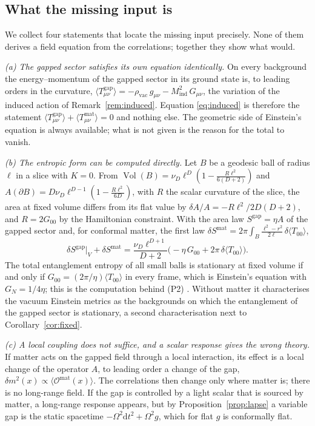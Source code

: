 \documentclass[11pt,a4paper]{article}
\theoremstyle{stmt}
\theoremstyle{defn}
\theoremstyle{rmk}
\numberwithin{equation}{section}
\DeclareMathOperator{\Vol}{Vol}
\newcommand{\dd}{\mathrm{d}}
\begin{document}
\subsection{What the missing input is}\label{sec:central}

We collect four statements that locate the missing input precisely. None of them derives a field equation from the correlations; together they show what would.

\emph{(a) The gapped sector satisfies its own equation identically.} On every background the energy--momentum of the gapped sector in its ground state is, to leading orders in the curvature, $\langle T^{\mathrm{gap}}_{\mu\nu}\rangle=-\rho_{\mathrm{vac}}\,g_{\mu\nu}-M_{\mathrm{ind}}^2\,G_{\mu\nu}$, the variation of the induced action of Remark~\ref{rem:induced}. Equation \eqref{eq:induced} is therefore the statement $\langle T^{\mathrm{gap}}_{\mu\nu}\rangle+\langle T^{\mathrm{mat}}_{\mu\nu}\rangle=0$ and nothing else. The geometric side of Einstein's equation is always available; what is not given is the reason for the total to vanish.

\emph{(b) The entropic form can be computed directly.} Let $B$ be a geodesic ball of radius $\ell$ in a slice with $K=0$. From $\Vol(B)=\nu_D\ell^D(1-\tfrac{R\ell^2}{6(D+2)})$ and $A(\partial B)=D\nu_D\ell^{D-1}(1-\tfrac{R\ell^2}{6D})$, with $R$ the scalar curvature of the slice, the area at fixed volume differs from its flat value by $\delta A/A=-R\ell^2/2D(D+2)$, and $R=2G_{00}$ by the Hamiltonian constraint. With the area law $S^{\mathrm{gap}}=\eta A$ of the gapped sector and, for conformal matter, the first law $\delta S^{\mathrm{mat}}=2\pi\int_B\frac{\ell^2-r^2}{2\ell}\,\delta\langle T_{00}\rangle$,
\begin{equation}\label{eq:equilibrium}
\delta S^{\mathrm{gap}}\big|_V+\delta S^{\mathrm{mat}}=\frac{\nu_D\ell^{D+1}}{D+2}\Big(-\eta\,G_{00}+2\pi\,\delta\langle T_{00}\rangle\Big).
\end{equation}
The total entanglement entropy of all small balls is stationary at fixed volume if and only if $G_{00}=(2\pi/\eta)\langle T_{00}\rangle$ in every frame, which is Einstein's equation with $G_N=1/4\eta$; this is the computation behind (P2) \cite{Jacobson16}. Without matter it characterises the vacuum Einstein metrics as the backgrounds on which the entanglement of the gapped sector is stationary, a second characterisation next to Corollary~\ref{cor:fixed}.

\emph{(c) A local coupling does not suffice, and a scalar response gives the wrong theory.} If matter acts on the gapped field through a local interaction, its effect is a local change of the operator $A$, to leading order a change of the gap, $\delta m^2(x)\propto\langle\mathcal O^{\mathrm{mat}}(x)\rangle$. The correlations then change only where matter is; there is no long-range field. If the gap is controlled by a light scalar that is sourced by matter, a long-range response appears, but by Proposition~\ref{prop:lapse} a variable gap is the static spacetime $-\Omega^2\dd t^2+\Omega^2g$, which for flat $g$ is conformally flat.
\end{document}
